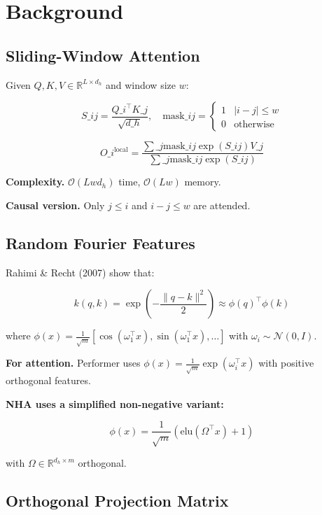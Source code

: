 
\section{Background}

\subsection{Sliding-Window Attention}

Given $Q, K, V \in \mathbb{R}^{L \times d_h}$ and window size $w$:

\[
S\_{ij} = \frac{Q\_i^\top K\_j}{\sqrt{d\_h}}, \quad
\text{mask}\_{ij} = \begin{cases} 1 & |i - j| \leq w \\ 0 & \text{otherwise} \end{cases}
\tag{3.1}
\]

\[
O\_i^\text{local} = \frac{\sum\_j \text{mask}\_{ij} \exp(S\_{ij}) V\_j}{\sum\_j \text{mask}\_{ij} \exp(S\_{ij})}
\tag{3.2}
\]

\textbf{Complexity.} $\mathcal{O}(L w d_h)$ time, $\mathcal{O}(L w)$ memory.

\textbf{Causal version.} Only $j \le i$ and $i - j \leq w$ are attended.

\subsection{Random Fourier Features}

Rahimi \& Recht (2007) show that:

\[
k(q, k) = \exp\!\left(-\frac{\|q - k\|^2}{2}\right) \approx \phi(q)^\top \phi(k)
\tag{3.3}
\]

where $\phi(x) = \frac{1}{\sqrt{m}} \left[\cos(\omega_1^\top x), \sin(\omega_1^\top x), \ldots\right]$ 
with $\omega_i \sim \mathcal{N}(0, I)$.

\textbf{For attention.} Performer uses $\phi(x) = \frac{1}{\sqrt{m}} \exp(\omega_i^\top x)$ 
with positive orthogonal features.

\textbf{NHA uses a simplified non-negative variant:}

\[
\phi(x) = \frac{1}{\sqrt{m}} (\mathrm{elu}(\Omega^\top x) + 1)
\tag{3.4}
\]

with $\Omega \in \mathbb{R}^{d_h \times m}$ orthogonal.

\subsection{Orthogonal Projection Matrix}

